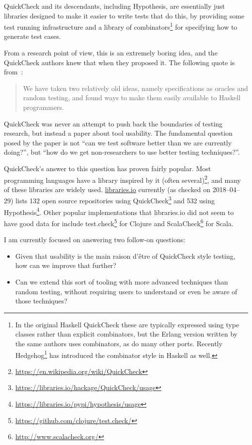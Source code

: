 QuickCheck and its descendants,
including Hypothesis,
are essentially just libraries designed to make it easier to write tests that do this,
by providing some test running infrastructure and a library of combinators\footnote{
In the original Haskell QuickCheck these are typically expressed using type classes rather than explicit combinators,
but the Erlang version written by the same authors uses combinators,
as do many other ports.
Recently Hedgehog\footnote{\url{https://en.wikipedia.org/wiki/QuickCheck}} has introduced the combinator style in Haskell as well.
}
for specifying how to generate test cases.

From a research point of view,
this is an extremely boring idea,
and the QuickCheck authors knew that when they proposed it.
The following quote is from~\cite{DBLP:conf/icfp/ClaessenH00}:

\begin{quote}
We have taken two relatively old ideas, namely specifications
as oracles and random testing, and found ways to make
them easily available to Haskell programmers.
\end{quote}

QuickCheck was never an attempt to push back the boundaries of testing research,
but instead a paper about tool usability.
The fundamental question posed by the paper is not ``can we test software better than we are currently doing?'',
but ``how do we get non-researchers to use better testing techniques?''.

QuickCheck's answer to this question has proven fairly popular.
Most programming languages have a library inspired by it (often several)\footnote{\url{https://en.wikipedia.org/wiki/QuickCheck}},
and many of these libraries are widely used.
\href{http://libraries.io}{libraries.io} currently (as checked on 2018--04--29) lists 132 open source repositories using QuickCheck\footnote{\url{https://libraries.io/hackage/QuickCheck/usage}} and 532 using Hypothesis\footnote{\url{https://libraries.io/pypi/hypothesis/usage}}.
Other popular implementations that libraries.io did not seem to have good data for include test.check\footnote{\url{https://github.com/clojure/test.check/}} for Clojure and ScalaCheck\footnote{\url{http://www.scalacheck.org/}} for Scala.

I am currently focused on answering two follow-on questions:

\begin{itemize}
\item Given that usability is the main raison d'être of QuickCheck style testing,
how can we improve that further?
\item Can we extend this sort of tooling with more advanced techniques than random testing,
without requiring users to understand or even be aware of those techniques?
\end{itemize}

